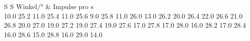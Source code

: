 \begin{table}[H]
  \centering
  \caption{Messwerte des Absorptionsspektrums von Brom}
  \label{tab:tabe3}
    \begin{tabular}{S S}
    \toprule
    $ \text{Winkel} / ° $ & $ \text{Impulse pro s}$\\
    	10.0
    25.2	11.0
    25.4	11.0
    25.6	9.0
    25.8	11.0
    26.0	13.0
    26.2	20.0
    26.4	22.0
    26.6	21.0
    26.8	20.0
    27.0	19.0
    27.2	19.0
    27.4	19.0
    27.6	17.0
    27.8	17.0
    28.0	16.0
    28.2	17.0
    28.4	16.0
    28.6	15.0
    28.8	16.0
    29.0	14.0

          \bottomrule
        \end{tabular}
    \end{table}
